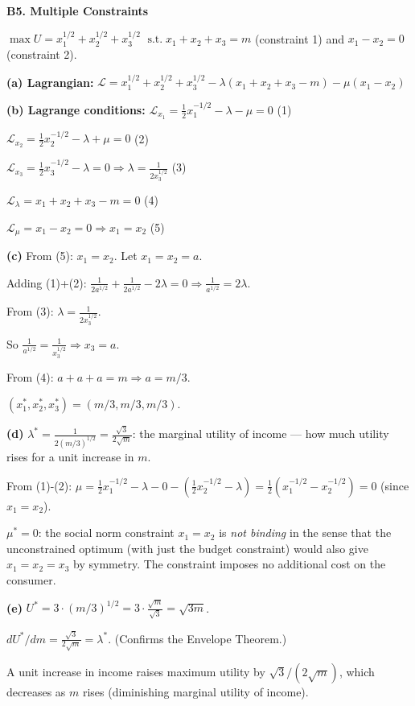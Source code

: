 \documentclass[12pt, a4paper]{article}
\theoremstyle{definition}
\newcommand{\st}{\;\text{s.t.}\;}
\begin{document}
\begin{solbox}
\textbf{B5. Multiple Constraints}

$\max U = x_1^{1/2}+x_2^{1/2}+x_3^{1/2}$
$\st x_1+x_2+x_3=m$ (constraint 1) and $x_1-x_2=0$ (constraint 2).

\textbf{(a) Lagrangian:}
$\mathcal{L} = x_1^{1/2}+x_2^{1/2}+x_3^{1/2}
- \lambda(x_1+x_2+x_3-m)
- \mu(x_1-x_2)$

\textbf{(b) Lagrange conditions:}
$\mathcal{L}_{x_1} = \frac{1}{2}x_1^{-1/2}-\lambda-\mu=0$ \quad (1)

$\mathcal{L}_{x_2} = \frac{1}{2}x_2^{-1/2}-\lambda+\mu=0$ \quad (2)

$\mathcal{L}_{x_3} = \frac{1}{2}x_3^{-1/2}-\lambda=0 \Rightarrow \lambda=\frac{1}{2x_3^{1/2}}$ \quad (3)

$\mathcal{L}_\lambda = x_1+x_2+x_3-m=0$ \quad (4)

$\mathcal{L}_\mu = x_1-x_2=0 \Rightarrow x_1=x_2$ \quad (5)

\textbf{(c)} From (5): $x_1=x_2$. Let $x_1=x_2=a$.

Adding (1)+(2): $\frac{1}{2a^{1/2}}+\frac{1}{2a^{1/2}}-2\lambda=0
\Rightarrow \frac{1}{a^{1/2}}=2\lambda$.

From (3): $\lambda=\frac{1}{2x_3^{1/2}}$.

So $\frac{1}{a^{1/2}} = \frac{1}{x_3^{1/2}} \Rightarrow x_3=a$.

From (4): $a+a+a=m \Rightarrow a=m/3$.

$(x_1^*,x_2^*,x_3^*)=(m/3,m/3,m/3)$.

\textbf{(d)} $\lambda^* = \frac{1}{2(m/3)^{1/2}} = \frac{\sqrt{3}}{2\sqrt{m}}$:
the marginal utility of income --- how much utility rises for a unit increase in $m$.

From (1)-(2): $\mu = \frac{1}{2}x_1^{-1/2}-\lambda-0 - (\frac{1}{2}x_2^{-1/2}-\lambda)
= \frac{1}{2}(x_1^{-1/2}-x_2^{-1/2}) = 0$ (since $x_1=x_2$).

$\mu^* = 0$: the social norm constraint $x_1=x_2$ is \emph{not binding} in the sense that the unconstrained optimum (with just the budget constraint) would also give $x_1=x_2=x_3$ by symmetry. The constraint imposes no additional cost on the consumer.

\textbf{(e)} $U^* = 3\cdot(m/3)^{1/2} = 3\cdot\frac{\sqrt{m}}{\sqrt{3}} = \sqrt{3m}$.

$dU^*/dm = \frac{\sqrt{3}}{2\sqrt{m}} = \lambda^*$. \checkmark (Confirms the Envelope Theorem.)

A unit increase in income raises maximum utility by $\sqrt{3}/(2\sqrt{m})$, which decreases as $m$ rises (diminishing marginal utility of income).
\end{solbox}
\end{document}
